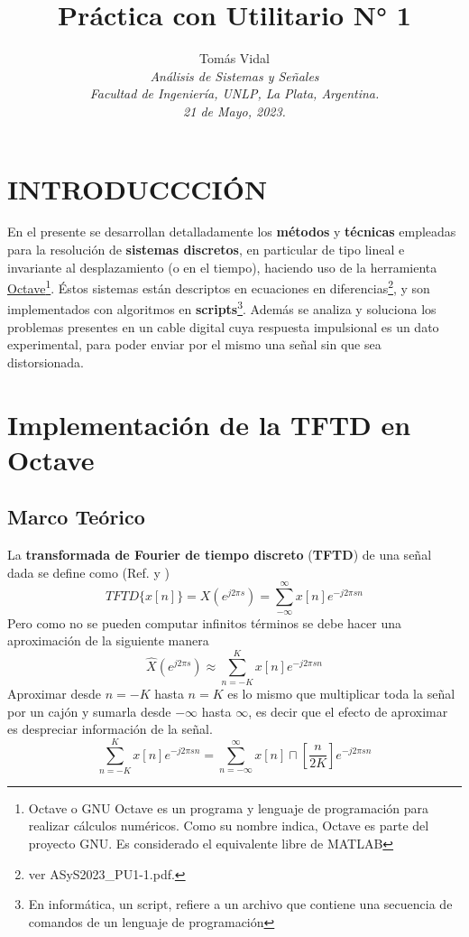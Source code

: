 \documentclass[letterpaper, 10 pt, conference]{ieeeconf}  %
\title{\LARGE \bf Pr\'actica con Utilitario N° 1}
\author{
  Tom\'as Vidal\\
  {\it An\'alisis de Sistemas y Se\~{n}ales}\\
  {\it Facultad de Ingenier\'ia, UNLP, La Plata, Argentina.}\\
  {\it 21 de Mayo, 2023.}
}
\begin{document}
\maketitle
\thispagestyle{empty}
\pagestyle{empty}

\section{INTRODUCCCI\'ON}
En el presente se desarrollan detalladamente los \textbf{m\'etodos} y \textbf{t\'ecnicas} empleadas para la resoluci\'on de \textbf{sistemas discretos}, en particular de tipo lineal e invariante al desplazamiento (o en el tiempo), haciendo uso de la herramienta \href{https://octave.org/}{Octave}\footnote{Octave o GNU Octave es un programa y lenguaje de programaci\'on para realizar c\'alculos num\'ericos. Como su nombre indica, Octave es parte del proyecto GNU. Es considerado el equivalente libre de MATLAB}. \'Estos sistemas est\'an descriptos en ecuaciones en diferencias\footnote{ver ASyS2023\_PU1-1.pdf.}, y son implementados con algoritmos en \textbf{scripts}\footnote{En inform\'atica, un script, refiere a un archivo que contiene una secuencia de comandos de un lenguaje de programaci\'on}. Adem\'as se analiza y soluciona los problemas presentes en un cable digital cuya respuesta impulsional es un dato experimental, para poder enviar por el mismo una se\~nal sin que sea distorsionada.

\section{Implementaci\'on de la \textbf{TFTD} en Octave}
\subsection{Marco Te\'orico} \label{subsec:TFTD}
La \textbf{transformada de Fourier de tiempo discreto} (\textbf{TFTD}) de una se\~{n}al dada se define como (Ref. \cite{bib:tftd_tp5} y \cite{bib:tftd_teoria})
\[
  TFTD\{x[n]\} = X(e^{j2{\pi}s}) = \sum_{-\infty}^{\infty}{x[n]e^{-j2{\pi}sn}}
\]
Pero como no se pueden computar infinitos t\'erminos se debe hacer una aproximaci\'on de la siguiente manera
\[
  \hat{X}(e^{j2{\pi}s}) \approx \sum_{n=-K}^{K}{x[n]e^{-j2{\pi}sn}}
\]
Aproximar desde $n=-K$ hasta $n=K$ es lo mismo que multiplicar toda la se\~nal por un caj\'on y sumarla desde $-\infty$ hasta $\infty$, es decir que el efecto de aproximar es despreciar informaci\'on de la se\~nal.
\[
  \sum_{n=-K}^{K}{x[n]e^{-j2{\pi}sn}} = \sum_{n=-\infty}^{\infty}{x[n]\sqcap[\frac{n}{2K}]e^{-j2{\pi}sn}}
\]
\end{document}
